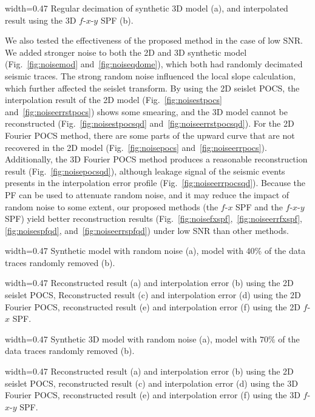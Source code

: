  {width=0.47\columnwidth} {Regular
  decimation of synthetic 3D model (a), and interpolated result using
  the 3D $f$-$x$-$y$ SPF (b).}

We also tested the effectiveness of the proposed method in the case of
low SNR.  We added stronger noise to both the 2D and 3D synthetic
model (Fig.~\ref{fig:noisemod} and~\ref{fig:noiseqdome}), which both
had randomly decimated seismic traces.  The strong random noise
influenced the local slope calculation, which further affected the
seislet transform.  By using the 2D seislet POCS, the interpolation
result of the 2D model (Fig.~\ref{fig:noisestpocs}
and~\ref{fig:noiseerrstpocs}) shows some smearing, and the 3D model
cannot be reconstructed (Fig.~\ref{fig:noisestpocsqd}
and~\ref{fig:noiseerrstpocsqd}).  For the 2D Fourier POCS method,
there are some parts of the upward curve that are not recovered in the
2D model (Fig.~\ref{fig:noisepocs}
and~\ref{fig:noiseerrpocs}). Additionally, the 3D Fourier POCS method
produces a reasonable reconstruction result
(Fig.~\ref{fig:noisepocsqd}), although leakage signal of the seismic
events presents in the interpolation error profile
(Fig.~\ref{fig:noiseerrpocsqd}).  Because the PF can be used to
attenuate random noise, and it may reduce the impact of random noise
to some extent, our proposed methods (the $f$-$x$ SPF and the
$f$-$x$-$y$ SPF) yield better reconstruction results
(Fig.~\ref{fig:noisefxspf},~\ref{fig:noiseerrfxspf},
\ref{fig:noisespfqd}, and~\ref{fig:noiseerrspfqd}) under low SNR than
other methods.

 {width=0.47\columnwidth} {Synthetic
  model with random noise (a), model with 40\% of the data traces
  randomly removed (b).}

{width=0.47\columnwidth} {Reconstructed result (a) and interpolation
  error (b) using the 2D seislet POCS, Reconstructed result (c) and
  interpolation error (d) using the 2D Fourier POCS, reconstructed
  result (e) and interpolation error (f) using the 2D $f$-$x$ SPF.}

 {width=0.47\columnwidth}
{Synthetic 3D model with random noise (a), model with $70\%$ of the
  data traces randomly removed (b).}

{width=0.47\columnwidth} {Reconstructed result (a) and interpolation
  error (b) using the 2D seislet POCS, reconstructed result (c) and
  interpolation error (d) using the 3D Fourier POCS, reconstructed
  result (e) and interpolation error (f) using the 3D $f$-$x$-$y$
  SPF.}

